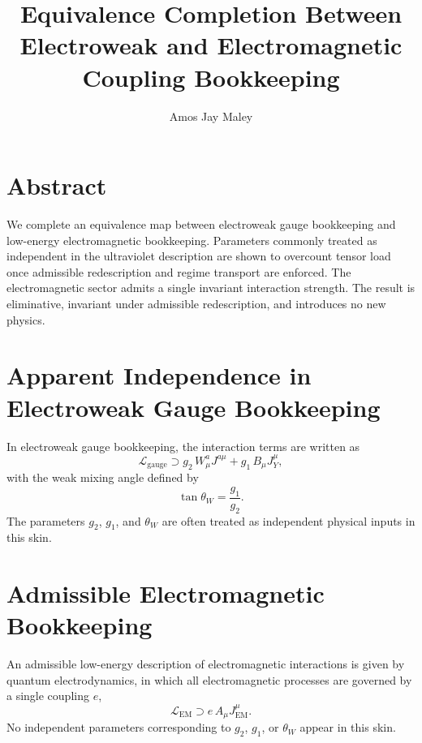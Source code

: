 ﻿\documentclass[11pt]{article}
\title{Equivalence Completion Between Electroweak and Electromagnetic Coupling Bookkeeping}
\author{Amos Jay Maley}
\date{}
\begin{document}
\maketitle

\section*{Abstract}
We complete an equivalence map between electroweak gauge bookkeeping and low-energy electromagnetic bookkeeping. Parameters commonly treated as independent in the ultraviolet description are shown to overcount tensor load once admissible redescription and regime transport are enforced. The electromagnetic sector admits a single invariant interaction strength. The result is eliminative, invariant under admissible redescription, and introduces no new physics.

\section{Apparent Independence in Electroweak Gauge Bookkeeping}
In electroweak gauge bookkeeping, the interaction terms are written as
\begin{equation}
\mathcal{L}_{\text{gauge}} \supset g_2\, W^a_\mu J^{a\mu} + g_1\, B_\mu J_Y^\mu ,
\end{equation}
with the weak mixing angle defined by
\begin{equation}
\tan\theta_W = \frac{g_1}{g_2}.
\end{equation}
The parameters $g_2$, $g_1$, and $\theta_W$ are often treated as independent physical inputs in this skin.

\section{Admissible Electromagnetic Bookkeeping}
An admissible low-energy description of electromagnetic interactions is given by quantum electrodynamics, in which all electromagnetic processes are governed by a single coupling $e$,
\begin{equation}
\mathcal{L}_{\text{EM}} \supset e\, A_\mu J_{\text{EM}}^\mu .
\end{equation}
No independent parameters corresponding to $g_2$, $g_1$, or $\theta_W$ appear in this skin.
\end{document}
